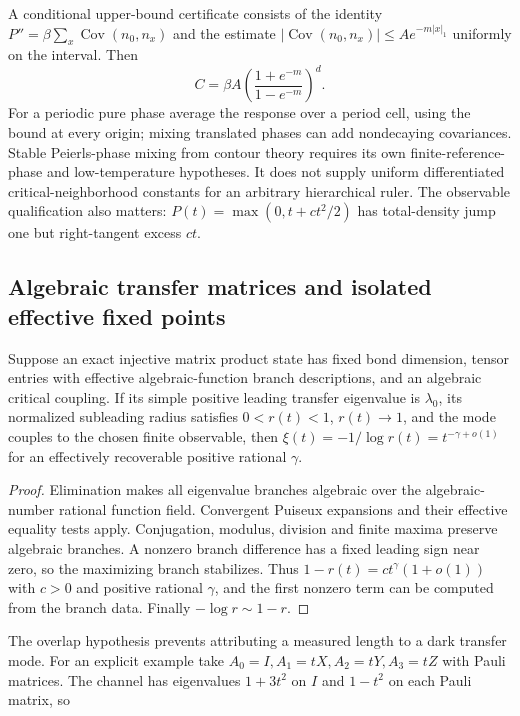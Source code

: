 A conditional upper-bound certificate consists of the identity
$P''=\beta\sum_x\operatorname{Cov}(n_0,n_x)$ and the estimate
$|\operatorname{Cov}(n_0,n_x)|\leq A e^{-m|x|_1}$ uniformly on
the interval. Then
\[
 C=\beta A\left(\frac{1+e^{-m}}{1-e^{-m}}\right)^d.
\]
For a periodic pure phase average the response over a period cell,
using the bound at every origin; mixing translated phases can add
nondecaying covariances. Stable Peierls-phase mixing from contour
theory \cite{contourTheory} requires its own finite-reference-phase
and low-temperature hypotheses. It does not supply uniform
differentiated critical-neighborhood constants for an arbitrary
hierarchical ruler. The observable qualification also matters:
$P(t)=\max(0,t+ct^2/2)$ has total-density jump one but
right-tangent excess $ct$.

\subsection{Algebraic transfer matrices and isolated effective fixed points}
\begin{proposition}
\label{prop:algebraic-transfer}
Suppose an exact injective matrix product state has fixed bond
dimension, tensor entries with effective algebraic-function branch
descriptions, and an algebraic critical coupling. If its simple
positive leading transfer eigenvalue is $\lambda_0$, its normalized
subleading radius satisfies $0<r(t)<1$, $r(t)\to1$, and the mode
couples to the chosen finite observable, then
$\xi(t)=-1/\log r(t)=t^{-\gamma+o(1)}$ for an effectively
recoverable positive rational $\gamma$.
\end{proposition}
\begin{proof}
Elimination makes all eigenvalue branches algebraic over the
algebraic-number rational function field. Convergent Puiseux
expansions and their effective equality tests
\cite{effectivePuiseux} apply. Conjugation, modulus, division and
finite maxima preserve algebraic branches. A nonzero branch
difference has a fixed leading sign near zero, so the maximizing
branch stabilizes. Thus $1-r(t)=ct^\gamma(1+o(1))$ with
$c>0$ and positive rational $\gamma$, and the first nonzero term
can be computed from the branch data. Finally $-\log r\sim1-r$.
\end{proof}
The overlap hypothesis prevents attributing a measured length to a
dark transfer mode. For an explicit example take
$A_0=I,A_1=tX,A_2=tY,A_3=tZ$ with Pauli matrices. The channel has
eigenvalues $1+3t^2$ on $I$ and $1-t^2$ on each Pauli matrix, so
